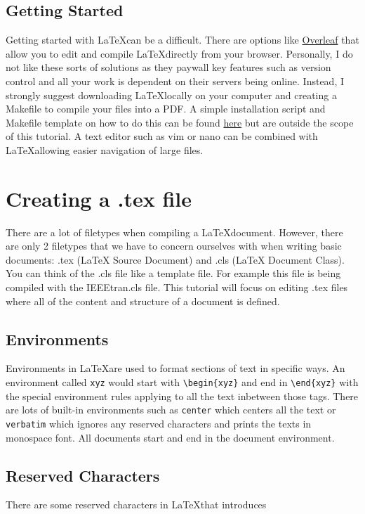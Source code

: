 \documentclass[12pt,journal,compsoc]{IEEEtran}
\begin{document}
\subsection{Getting Started}
Getting started with \LaTeX \space can be a difficult. There are options like \href{https://www.overleaf.com/}{Overleaf} that allow you to edit and compile \LaTeX \space directly from your browser. Personally, I do not like these sorts of solutions as they paywall key features such as version control and all your work is dependent on their servers being online. Instead, I strongly suggest downloading \LaTeX \space locally on your computer and creating a Makefile to compile your files into a PDF. A simple installation script and Makefile template on how to do this can be found \href{https://gist.github.com/ankitsxchdeva/1eb2afaad782a92b9a129a9452ae97bb}{here} but are outside the scope of this tutorial. A text editor such as vim or nano can be combined with \LaTeX \space allowing easier navigation of large files. 


\section{Creating a .tex file}
There are a lot of filetypes when compiling a \LaTeX \space document. However, there are only 2 filetypes that we have to concern ourselves with when writing basic documents: .tex (LaTeX Source Document) and .cls (LaTeX Document Class). You can think of the .cls file like a template file. For example this file is being compiled with the IEEEtran.cls file. This tutorial will focus on editing .tex files where all of the content and structure of a document is defined.

\subsection{Environments}
Environments in \LaTeX \space are used to format sections of text in specific ways. An environment called \verb|xyz| would start with \verb|\begin{xyz}| and end in \verb|\end{xyz}| with the special environment rules applying to all the text inbetween those tags. There are lots of built-in environments such as \verb|center| which centers all the text or \verb|verbatim| which ignores any reserved characters and prints the texts in monospace font. All documents start and end in the document environment.

\subsection{Reserved Characters}
There are some reserved characters in \LaTeX \space that introduces 
\end{document}
